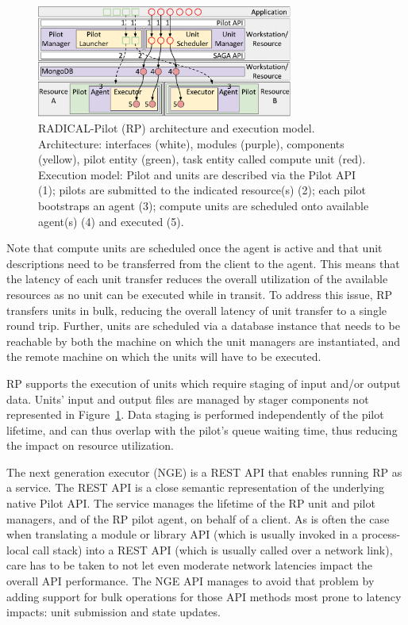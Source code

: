 \documentclass{webofc}
\begin{document}
\begin{figure}
  \centering
  \includegraphics[width=0.75\textwidth]{figures/rp_arch.pdf}
  \caption{RADICAL-Pilot (RP) architecture and execution model. Architecture:
           interfaces (white), modules (purple), components (yellow), pilot
           entity (green), task entity called compute unit (red). Execution
           model: Pilot and units are described via the Pilot API (1); pilots
           are submitted to the indicated resource(s) (2); each pilot
           bootstraps an agent (3); compute units are scheduled onto
           available agent(s) (4) and executed (5).}\label{fig:rp-arch}
\end{figure}
	
Note that compute units are scheduled once the agent is active and that unit
descriptions need to be transferred from the client to the agent. This means
that the latency of each unit transfer reduces the overall utilization of the
available resources as no unit can be executed while in transit. To address
this issue, RP transfers units in bulk, reducing the overall latency of unit
transfer to a single round trip. Further, units are scheduled via a database
instance that needs to be reachable by both the machine on which the unit
managers are instantiated, and the remote machine on which the units will
have to be executed.
	
RP supports the execution of units which require staging of input and/or
output data. Units’ input and output files are managed by stager components
not represented in Figure~\ref{fig:rp-arch}. Data staging is performed
independently of the pilot lifetime, and can thus overlap with the pilot's
queue waiting time, thus reducing the impact on resource utilization.
	
The next generation executor (NGE) is a REST API that enables running RP as a
service. The REST API is a close semantic representation of the underlying
native Pilot API.  The service manages the lifetime of the RP unit and pilot
managers, and of the RP pilot agent, on behalf of a client. As is often the
case when translating a module or library API (which is usually invoked in a
process-local call stack) into a REST API (which is usually called over a
network link), care has to be taken to not let even moderate network
latencies impact the overall API performance.  The NGE API manages to avoid
that problem by adding support for bulk operations for those API methods most
prone to latency impacts: unit submission and state updates.
	
\end{document}
